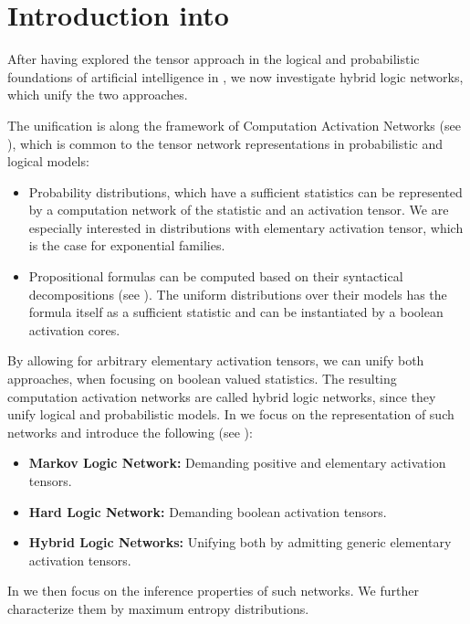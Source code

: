 \chapter{Introduction into }

After having explored the tensor approach in the logical and probabilistic foundations of artificial intelligence in , we now investigate hybrid logic networks, which unify the two approaches.



The unification is along the framework of Computation Activation Networks (see ), which is common to the tensor network representations in probabilistic and logical models:
\begin{itemize}
    \item Probability distributions, which have a sufficient statistics can be represented by a computation network of the statistic and an activation tensor.
    We are especially interested in distributions with elementary activation tensor, which is the case for exponential families.
    \item Propositional formulas can be computed based on their syntactical decompositions (see ).
    The uniform distributions over their models has the formula itself as a sufficient statistic and can be instantiated by a boolean activation cores.
\end{itemize}
By allowing for arbitrary elementary activation tensors, we can unify both approaches, when focusing on boolean valued statistics.
The resulting computation activation networks are called hybrid logic networks, since they unify logical and probabilistic models.
In  we focus on the representation of such networks and introduce the following (see ):
\begin{itemize}
    \item \textbf{Markov Logic Network:} Demanding positive and elementary activation tensors.
    \item \textbf{Hard Logic Network:} Demanding boolean activation tensors.
    \item \textbf{Hybrid Logic Networks:} Unifying both by admitting generic elementary activation tensors.
\end{itemize}
In  we then focus on the inference properties of such networks.
We further characterize them by maximum entropy distributions.

